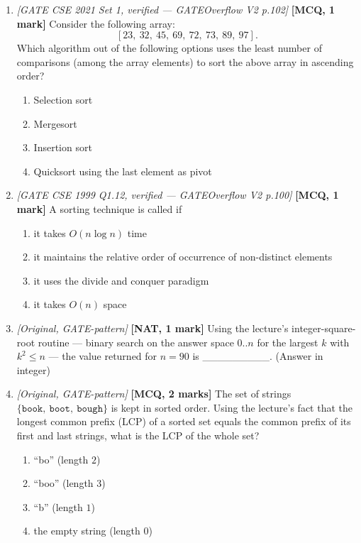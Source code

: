 \documentclass[11pt]{article}
\begin{document}
\begin{enumerate}
\item[\textbf{Q4}] \textit{[GATE CSE 2021 Set 1, verified --- GATEOverflow V2 p.102]} \textbf{[MCQ, 1 mark]} Consider the following array:
\[
[23,\ 32,\ 45,\ 69,\ 72,\ 73,\ 89,\ 97].
\]
Which algorithm out of the following options uses the least number of comparisons (among the array elements) to sort the above array in ascending order?
\begin{enumerate}
  \item[(A)] Selection sort
  \item[(B)] Mergesort
  \item[(C)] Insertion sort
  \item[(D)] Quicksort using the last element as pivot
\end{enumerate}

\item[\textbf{Q5}] \textit{[GATE CSE 1999 Q1.12, verified --- GATEOverflow V2 p.100]} \textbf{[MCQ, 1 mark]} A sorting technique is called  if
\begin{enumerate}
  \item[(A)] it takes $O(n\log n)$ time
  \item[(B)] it maintains the relative order of occurrence of non-distinct elements
  \item[(C)] it uses the divide and conquer paradigm
  \item[(D)] it takes $O(n)$ space
\end{enumerate}

\item[\textbf{Q6}] \textit{[Original, GATE-pattern]} \textbf{[NAT, 1 mark]} Using the lecture's integer-square-root routine --- binary search on the answer space $0..n$ for the largest $k$ with $k^2 \le n$ --- the value returned for $n = 90$ is \_\_\_\_\_\_\_\_\_. (Answer in integer)

\item[\textbf{Q7}] \textit{[Original, GATE-pattern]} \textbf{[MCQ, 2 marks]} The set of strings $\{\texttt{book},\ \texttt{boot},\ \texttt{bough}\}$ is kept in sorted order. Using the lecture's fact that the longest common prefix (LCP) of a sorted set equals the common prefix of its first and last strings, what is the LCP of the whole set?
\begin{enumerate}
  \item[(A)] ``bo'' (length $2$)
  \item[(B)] ``boo'' (length $3$)
  \item[(C)] ``b'' (length $1$)
  \item[(D)] the empty string (length $0$)
\end{enumerate}


\end{enumerate}
\end{document}
